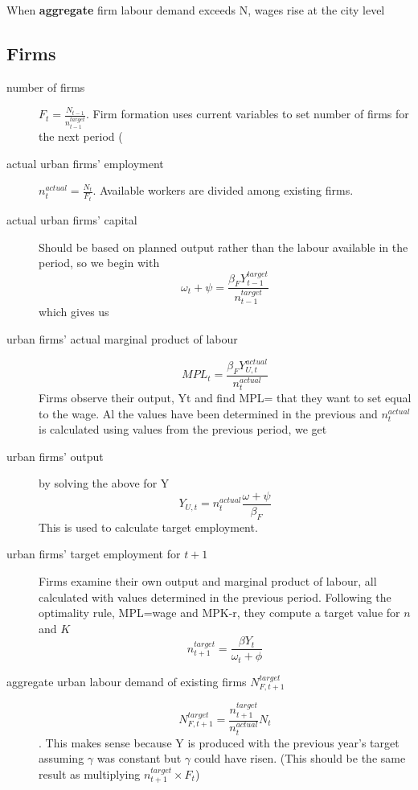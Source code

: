 When \textbf{aggregate} firm labour demand exceeds N, wages rise at the city level


\subsection{Firms}
\begin{description}
\item[number of firms] $F_{t}=\frac{N_{t-1}}{n^{target}_{t-1}}$. Firm formation uses current variables to set number of firms for the next period 
(\color{red}
\item[actual urban firms' employment] 
$n_t^{actual}= \frac{N_t}{F_t} $. Available workers are divided among existing firms.   

\item[actual urban firms' capital] Should be based on planned output rather than the labour available in the period, so we begin with \[\omega_{t}+\psi = \frac{\beta_{F}Y^{target}_{t-1}}{n_{t-1}^{target}}\]
which gives us 


\item[urban firms' actual marginal product of labour]
\[MPL_{t} = \frac{\beta_{F}Y^{actual}_{U,t}}{n_t^{actual}}\] \noindent Firms observe their output, Yt and find  MPL= that they want to set equal to the wage. Al the values have been determined in the previous  and $n^{actual}_t$ is calculated using values from the  previous period, we get

\item[urban firms' output] by solving the above for Y
\[Y_{U,t}=  n_t^{actual}\frac{\omega+\psi}{\beta_{F}} \] 
This is used to calculate target employment.

\item[urban firms' target employment for $t+1$] Firms examine their own output and marginal product of labour, all calculated with values determined in the previous period. Following the  optimality rule, MPL=wage and MPK-r, they compute a target value for $n$ and $K$
\[ n^{target}_{t+1}= \frac{\beta Y_{t}}{\omega_t + \phi} \]



\item[aggregate urban labour demand of existing firms $N_{F,t+1}^{target}$] 

\[N_{F,t+1}^{target} = \frac{n^{target}_{t+1}}{n^{actual}_{t}} N_t\].   
This makes sense because Y is produced with the previous year's target assuming  $\gamma$ was constant but  $\gamma$ could have risen. (This should be the same result as  multiplying $n^{target}_{t+1} \times F_{t} $)




\end{description}
